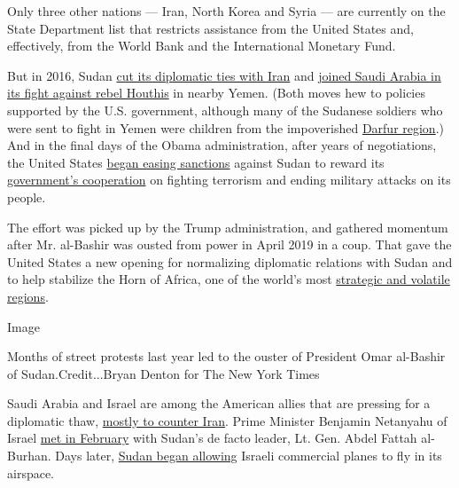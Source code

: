Only three other nations --- Iran, North Korea and Syria --- are
currently on the State Department list that restricts assistance from
the United States and, effectively, from the World Bank and the
International Monetary Fund.

But in 2016, Sudan
\href{https://www.reuters.com/article/us-saudi-iran-sudan/sudan-cuts-diplomatic-ties-with-iran-idUSKBN0UI17720160104}{cut
its diplomatic ties with Iran} and
\href{https://www.crisisgroup.org/africa/horn-africa/horn-africa-states-follow-gulf-yemen-war}{joined
Saudi Arabia in its fight against rebel Houthis} in nearby Yemen. (Both
moves hew to policies supported by the U.S. government, although many of
the Sudanese soldiers who were sent to fight in Yemen were children from
the impoverished
\href{https://www.nytimes3xbfgragh.onion/2020/07/30/world/middleeast/darfur-sudan.html}{Darfur
region}.) And in the final days of the Obama administration, after years
of negotiations, the United States
\href{https://www.france24.com/en/20170113-sudan-usa-sanctions-easing-terrorism}{began
easing sanctions} against Sudan to reward its
\href{https://www.dabangasudan.org/en/all-news/article/donald-booth-sanctions-relief-is-a-start-to-address-sudan-s-human-rights-issues}{government's
cooperation} on fighting terrorism and ending military attacks on its
people.

The effort was picked up by the Trump administration, and gathered
momentum after Mr. al-Bashir was ousted from power in April 2019 in a
coup. That gave the United States a new opening for normalizing
diplomatic relations with Sudan and to help stabilize the Horn of
Africa, one of the world's most
\href{https://agsiw.org/gulf-strategic-interests-reshaping-the-horn-of-africa/}{strategic
and volatile regions}.

Image

Months of street protests last year led to the ouster of President Omar
al-Bashir of Sudan.Credit...Bryan Denton for The New York Times

Saudi Arabia and Israel are among the American allies that are pressing
for a diplomatic thaw,
\href{https://jcpa.org/israel-comes-full-circle-with-sudan-analysis/}{mostly
to counter Iran}. Prime Minister Benjamin Netanyahu of Israel
\href{https://www.aljazeera.com/news/2020/02/netanyahu-israel-sudan-normalise-ties-200203182536972.html}{met
in February} with Sudan's de facto leader, Lt. Gen. Abdel Fattah
al-Burhan. Days later,
\href{https://www.reuters.com/article/us-israel-sudan/netanyahu-says-israeli-airliners-have-started-overflying-sudan-idUSKBN20A0NK}{Sudan
began allowing} Israeli commercial planes to fly in its airspace.

